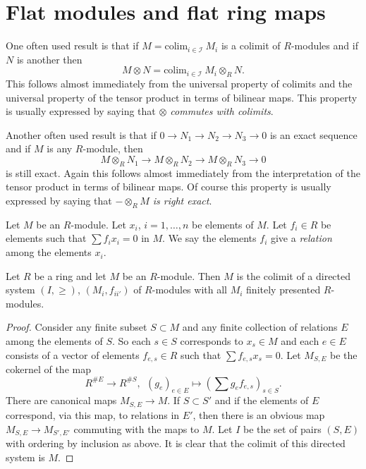 \section{Flat modules and flat ring maps}
\label{section-flat}

\noindent
One often used result is that if $M = \text{colim}_{i\in \mathcal{I}}\ M_i$
is a colimit of $R$-modules and if $N$ is another then
$$
M \otimes N
=
\text{colim}_{i\in \mathcal{I}}\ M_i \otimes_R N.
$$
This follows almost immediately from the universal 
property of colimits and the universal property of
the tensor product in terms of bilinear maps.
This property is usually expressed by saying
that {\it $\otimes$ commutes with colimits}.

\medskip\noindent
Another often used result is that if $0\to N_1 \to N_2 \to N_3\to 0$
is an exact sequence and if $M$ is any $R$-module, then
$$
M\otimes_R N_1
\to
M\otimes_R N_2
\to
M\otimes_R N_3
\to
0
$$
is still exact. Again this follows almost immediately from
the interpretation of the tensor product in terms of
bilinear maps. Of course this property is usually expressed
by saying that {\it $-\otimes_R M$ is right exact}.

\medskip\noindent
Let $M$ be an $R$-module. Let $x_i$, $i=1,\ldots,n$ be elements
of $M$. Let $f_i \in R$ be elements such that $\sum f_i x_i = 0$
in $M$. We say the elements $f_i$ give a {\it relation}
among the elements $x_i$.

\begin{lemma}
\label{lemma-module-colimit-fp}
Let $R$ be a ring and let $M$ be an $R$-module.
Then $M$ is the colimit of a directed system
$(I, \geq)$, $(M_i, f_{ii'})$ of $R$-modules
with all $M_i$ finitely presented $R$-modules.
\end{lemma}

\begin{proof}
Consider any finite subset $S \subset M$ and any finite
collection of relations $E$ among the elements
of $S$. So each $s \in S$ corresponds to $x_s \in M$ and
each $e \in E$ consists of a vector
of elements $f_{e,s} \in R$ such that $\sum f_{e,s} x_s = 0$.
Let $M_{S,E}$ be the cokernel of the map
$$
R^{\#E}
\longrightarrow
R^{\#S},\ \ 
(g_e)_{e\in E}
\longmapsto
(\sum g_e f_{e,s})_{s\in S}.
$$
There are canonical maps $M_{S,E} \to M$.
If $S \subset S'$ and if the elements of
$E$ correspond, via this map, to relations 
in $E'$, then there is an obvious map
$M_{S,E} \to M_{S', E'}$ commuting with the
maps to $M$. Let $I$ be the set of pairs 
$(S,E)$ with ordering by inclusion as above.
It is clear that the colimit of this directed system is $M$.
\end{proof}

